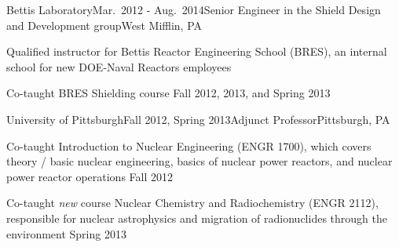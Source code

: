 
\begin{rSubsection}{Bettis Laboratory}{Mar.\ 2012 - Aug.\ 2014}{Senior Engineer in the Shield Design and Development group}{West Mifflin, PA}
\item Qualified instructor for Bettis Reactor Engineering School (BRES), an internal school for new DOE-Naval Reactors employees
\item Co-taught BRES Shielding course Fall 2012, 2013, and Spring 2013
\end{rSubsection}

\clearpage
\begin{rSubsection}{University of Pittsburgh}{Fall 2012, Spring 2013}{Adjunct Professor}{Pittsburgh, PA}
\item Co-taught Introduction to Nuclear Engineering (ENGR 1700), which covers theory / basic nuclear engineering, basics of nuclear power reactors, and nuclear power reactor operations Fall 2012
\item Co-taught \textit{new} course Nuclear Chemistry and Radiochemistry (ENGR 2112), responsible for nuclear astrophysics and migration of radionuclides through the environment Spring 2013
\end{rSubsection}



%
